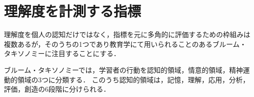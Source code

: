 \section{理解度を計測する指標}
理解度を個人の認知だけではなく，指標を元に多角的に評価するための枠組みは複数あるが，そのうちの1つであり教育学にて用いられることのあるブルーム・タキソノミー\cite{bib:anderson}に注目することにする．

ブルーム・タキソノミーでは，学習者の行動を認知的領域，情意的領域，精神運動的領域の3つに分類する．
このうち認知的領域は，記憶，理解，応用，分析，評価，創造の6段階に分けられる．
